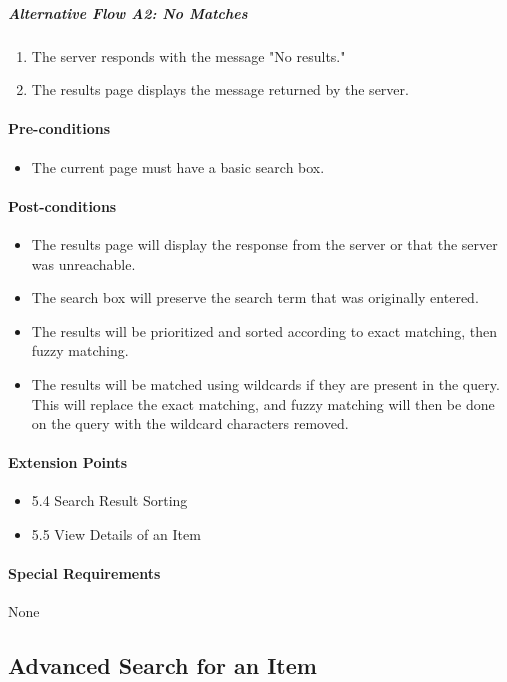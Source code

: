 \documentclass{article}
\begin{document}
\subparagraph{Alternative Flow A2: No Matches}
\begin{enumerate}
\item The server responds with the message "No results."
\item The results page displays the message returned by the server.
\end{enumerate}

\paragraph{Pre-conditions}
\begin{itemize}
\item The current page must have a basic search box.
\end{itemize}

\paragraph{Post-conditions}
\begin{itemize}
\item The results page will display the response from the server or that the server was unreachable.
\item The search box will preserve the search term that was originally entered.
\item The results will be prioritized and sorted according to exact matching, then fuzzy matching.
\item The results will be matched using wildcards if they are present in the query.  This will replace the exact matching, and fuzzy matching will then be done on the query with the wildcard characters removed.
\end{itemize}

\paragraph{Extension Points}
\begin{itemize}
\item 5.4 Search Result Sorting
\item 5.5 View Details of an Item
\end{itemize}

\paragraph{Special Requirements}
None


\subsection{Advanced Search for an Item}
\end{document}
